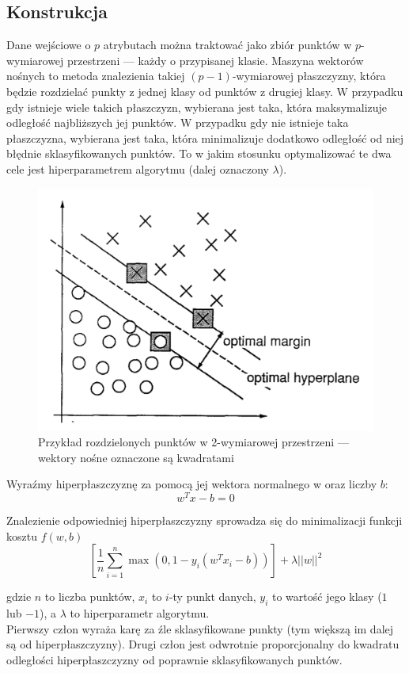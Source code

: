 \subsection{Konstrukcja}

Dane wejściowe o $p$ atrybutach można traktować jako zbiór punktów w $p$-wymiarowej przestrzeni --- każdy o przypisanej klasie. Maszyna wektorów nośnych to metoda znalezienia takiej $(p-1)$-wymiarowej płaszczyzny, która będzie rozdzielać punkty z jednej klasy od punktów z drugiej klasy. W przypadku gdy istnieje wiele takich płaszczyzn, wybierana jest taka, która maksymalizuje odległość najbliższych jej punktów. W przypadku gdy nie istnieje taka płaszczyzna, wybierana jest taka, która minimalizuje dodatkowo odległość od niej błędnie sklasyfikowanych punktów. To w jakim stosunku optymalizować te dwa cele jest hiperparametrem algorytmu (dalej oznaczony $\lambda$). 

\begin{figure}[H]
	\centering
	\includegraphics[width=0.6\linewidth]{images/chapter2/SVM.pdf}
	\caption{Przykład rozdzielonych punktów w 2-wymiarowej przestrzeni --- wektory nośne oznaczone są kwadratami \cite{cortes1995support}}
	\label{fig:svm}
\end{figure}
\noindent Wyraźmy hiperpłaszczyznę za pomocą jej wektora normalnego w oraz liczby $b$:
\begin{equation}
w^Tx - b = 0 
\end{equation}

\noindent Znalezienie odpowiedniej hiperpłaszczyzny sprowadza się do minimalizacji funkcji kosztu $f(w,b)$
\begin{equation}
\left[ \frac{1}{n}\sum_{i=1}^n \max(0, 1 - y_{i}(w^Tx_{i} - b))\right] + \lambda ||w|| ^2
\end{equation}

\noindent gdzie $n$ to liczba punktów, $x_i$ to $i$-ty punkt danych, $y_i$ to wartość jego klasy ($1$ lub $-1$), a $\lambda$ to hiperparametr algorytmu.
\\Pierwszy człon wyraża karę za źle sklasyfikowane punkty (tym większą im dalej są od hiperpłaszczyzny). Drugi człon jest odwrotnie proporcjonalny do kwadratu odległości hiperpłaszczyzny od poprawnie sklasyfikowanych punktów.

